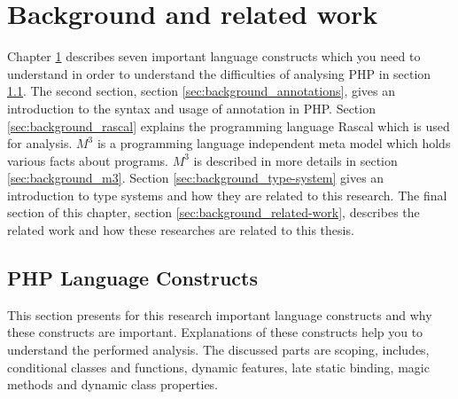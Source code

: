 \documentclass[../main.tex]{subfiles}
\begin{document}
    \chapter{Background and related work}\label{chap:background}
    Chapter \ref{chap:background} describes seven important language constructs which you need to understand in order to understand the difficulties of analysing PHP in section \ref{sec:background_language-constructs}.
    The second section, section \ref{sec:background_annotations}, gives an introduction to the syntax and usage of annotation in PHP.
    Section \ref{sec:background_rascal} explains the programming language \Gls{Rascal} which is used for analysis.
    $M^3$ is a programming language independent meta model which holds various facts about programs. $M^3$ is described in more details in section \ref{sec:background_m3}.
    Section \ref{sec:background_type-system} gives an introduction to type systems and how they are related to this research.
    The final section of this chapter, section \ref{sec:background_related-work}, describes the related work and how these researches are related to this thesis.

    \section{PHP Language Constructs}\label{sec:background_language-constructs}
    This section presents for this research important language constructs and why these constructs are important.
    Explanations of these constructs help you to understand the performed analysis.
    The discussed parts are scoping, includes, conditional classes and functions, dynamic features, late static binding, magic methods and dynamic class properties.
    
\end{document}
